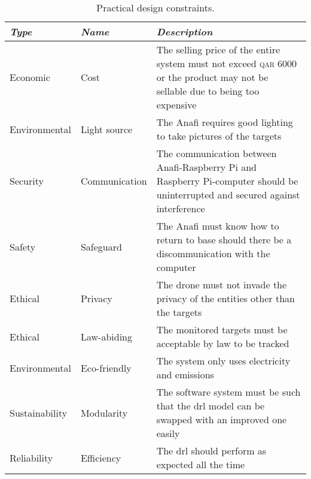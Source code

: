 \documentclass[../main.tex]{subfiles}
\begin{document}
\begin{table}[H]
    \centering
    \caption{Practical design constraints.}
    \label{tab:practical-design-constraints}
    \begin{tabular}{ P{3cm} P{3cm} P{9cm} }
        \toprule
        \textit{Type} 
            & \textit{Name} 
                & \textit{Description} \\

        \midrule
        
        Economic 
            & Cost 
                & The selling price of the entire system must 
                not exceed \textsc{qar} 6000 or the product
                may not be sellable due to being too expensive \\
        
        Environmental 
            & Light source 
                & The Anafi requires good lighting to 
                take pictures of the targets \\
        
        Security 
            & Communication 
                & The communication between Anafi-Raspberry Pi 
                and Raspberry Pi-computer should be uninterrupted 
                and secured against interference \\
        
        Safety 
            & Safeguard 
                & The Anafi must know how to return to base 
                should there be a discommunication with the computer \\
        
        Ethical 
            & Privacy 
                & The drone must not invade the privacy of 
                the entities other than the targets \\
        
        Ethical 
            & Law-abiding 
                & The monitored targets must be acceptable 
                by law to be tracked \\
        
        Environmental 
            & Eco-friendly 
                & The system only uses electricity and emissions \\
        
        Sustainability 
            & Modularity 
                & The software system must be such that the \gls{drl} model 
                can be swapped with an improved one easily \\
        
        Reliability 
            & Efficiency 
                & The \gls{drl} should perform as expected all the time \\

        \bottomrule		
    \end{tabular}
\end{table}
\end{document}
